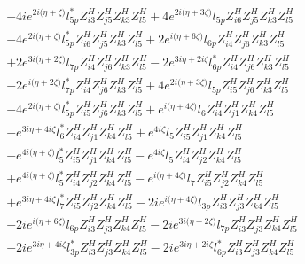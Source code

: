 \begin{align}
 &-4 i e^{2 i \Big(\eta +\zeta \Big)} l_{5p}^* Z_{{i 3}}^{H} Z_{{j 5}}^{H} Z_{{k 3}}^{H} Z_{{l 5}}^{H} +4 e^{2 i \Big(\eta +3 \zeta \Big)} l_{5p} Z_{{i 6}}^{H} Z_{{j 5}}^{H} Z_{{k 3}}^{H} Z_{{l 5}}^{H} \nonumber \\ 
 &-4 e^{2 i \Big(\eta +\zeta \Big)} l_{5p}^* Z_{{i 6}}^{H} Z_{{j 5}}^{H} Z_{{k 3}}^{H} Z_{{l 5}}^{H} +2 e^{i \Big(\eta +6 \zeta \Big)} l_{6p} Z_{{i 4}}^{H} Z_{{j 6}}^{H} Z_{{k 3}}^{H} Z_{{l 5}}^{H} \nonumber \\ 
 &+2 e^{3 i \Big(\eta +2 \zeta \Big)} l_{7p} Z_{{i 4}}^{H} Z_{{j 6}}^{H} Z_{{k 3}}^{H} Z_{{l 5}}^{H} -2 e^{3 i \eta +2 i \zeta } l_{6p}^* Z_{{i 4}}^{H} Z_{{j 6}}^{H} Z_{{k 3}}^{H} Z_{{l 5}}^{H} \nonumber \\ 
 &-2 e^{i \Big(\eta +2 \zeta \Big)} l_{7p}^* Z_{{i 4}}^{H} Z_{{j 6}}^{H} Z_{{k 3}}^{H} Z_{{l 5}}^{H} +4 e^{2 i \Big(\eta +3 \zeta \Big)} l_{5p} Z_{{i 5}}^{H} Z_{{j 6}}^{H} Z_{{k 3}}^{H} Z_{{l 5}}^{H} \nonumber \\ 
 &-4 e^{2 i \Big(\eta +\zeta \Big)} l_{5p}^* Z_{{i 5}}^{H} Z_{{j 6}}^{H} Z_{{k 3}}^{H} Z_{{l 5}}^{H} +e^{i \Big(\eta +4 \zeta \Big)} l_6 Z_{{i 4}}^{H} Z_{{j 1}}^{H} Z_{{k 4}}^{H} Z_{{l 5}}^{H} \nonumber \\ 
 &- e^{3 i \eta +4 i \zeta } l_6^* Z_{{i 4}}^{H} Z_{{j 1}}^{H} Z_{{k 4}}^{H} Z_{{l 5}}^{H} +e^{4 i \zeta } l_5 Z_{{i 5}}^{H} Z_{{j 1}}^{H} Z_{{k 4}}^{H} Z_{{l 5}}^{H} \nonumber \\ 
 &- e^{4 i \Big(\eta +\zeta \Big)} l_5^* Z_{{i 5}}^{H} Z_{{j 1}}^{H} Z_{{k 4}}^{H} Z_{{l 5}}^{H} - e^{4 i \zeta } l_5 Z_{{i 4}}^{H} Z_{{j 2}}^{H} Z_{{k 4}}^{H} Z_{{l 5}}^{H} \nonumber \\ 
 &+e^{4 i \Big(\eta +\zeta \Big)} l_5^* Z_{{i 4}}^{H} Z_{{j 2}}^{H} Z_{{k 4}}^{H} Z_{{l 5}}^{H} - e^{i \Big(\eta +4 \zeta \Big)} l_7 Z_{{i 5}}^{H} Z_{{j 2}}^{H} Z_{{k 4}}^{H} Z_{{l 5}}^{H} \nonumber \\ 
 &+e^{3 i \eta +4 i \zeta } l_7^* Z_{{i 5}}^{H} Z_{{j 2}}^{H} Z_{{k 4}}^{H} Z_{{l 5}}^{H} -2 i e^{i \Big(\eta +4 \zeta \Big)} l_{3p} Z_{{i 3}}^{H} Z_{{j 3}}^{H} Z_{{k 4}}^{H} Z_{{l 5}}^{H} \nonumber \\ 
 &-2 i e^{i \Big(\eta +6 \zeta \Big)} l_{6p} Z_{{i 3}}^{H} Z_{{j 3}}^{H} Z_{{k 4}}^{H} Z_{{l 5}}^{H} -2 i e^{3 i \Big(\eta +2 \zeta \Big)} l_{7p} Z_{{i 3}}^{H} Z_{{j 3}}^{H} Z_{{k 4}}^{H} Z_{{l 5}}^{H} \nonumber \\ 
 &-2 i e^{3 i \eta +4 i \zeta } l_{3p}^* Z_{{i 3}}^{H} Z_{{j 3}}^{H} Z_{{k 4}}^{H} Z_{{l 5}}^{H} -2 i e^{3 i \eta +2 i \zeta } l_{6p}^* Z_{{i 3}}^{H} Z_{{j 3}}^{H} Z_{{k 4}}^{H} Z_{{l 5}}^{H} \nonumber \\ 

\end{align}

